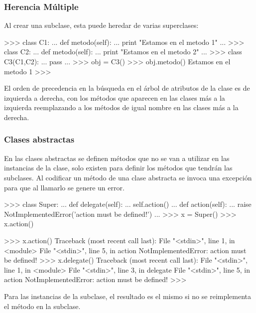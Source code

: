 \subsubsection{Herencia Múltiple}

Al crear una subclase, esta puede heredar de varias superclases:\\

\begin{pyglist} [language=python]
>>> class C1:
...      def metodo(self):
...          print "Estamos en el metodo 1"
... 
>>> class C2:
...      def metodo(self):
...          print "Estamos en el metodo 2"
... 
>>> class C3(C1,C2):
...     pass
... 
>>> obj = C3()
>>> obj.metodo()
Estamos en el metodo 1
>>> 
\end{pyglist}

El orden de precedencia en la búsqueda en el árbol de atributos de la clase es de izquierda a derecha, con los métodos que aparecen en las clases más a la izquierda reemplazando a los métodos de igual nombre en las clases más a la derecha.

\subsubsection{Clases abstractas}

En las clases abstractas se definen métodos que no se van a utilizar en las instancias de la clase, solo existen para definir los métodos que tendrán las subclases. Al codificar un método de una clase abstracta se invoca una excepción para que al llamarlo se genere un error.\\

\begin{pyglist} [language=python]
>>> class Super:
...     def delegate(self):
...         self.action()
...     def action(self):
...         raise NotImplementedError('action must be defined!')
... 
>>> x = Super()
>>> x.action()

>>> x.action()
Traceback (most recent call last):
  File "<stdin>", line 1, in <module>
  File "<stdin>", line 5, in action
NotImplementedError: action must be defined!
>>> x.delegate()
Traceback (most recent call last):
  File "<stdin>", line 1, in <module>
  File "<stdin>", line 3, in delegate
  File "<stdin>", line 5, in action
NotImplementedError: action must be defined!
>>> 
\end{pyglist}

Para las instancias de la subclase, el resultado es el mismo si no se reimplementa el método en la subclase.\\

